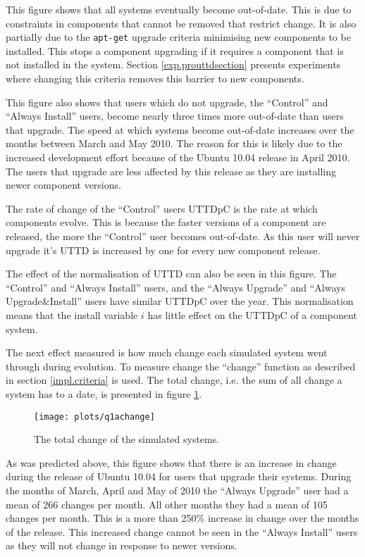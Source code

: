This figure shows that all systems eventually become out-of-date.
This is due to constraints in components that cannot be removed that restrict change. 
It is also partially due to the \texttt{apt-get} upgrade criteria minimising new components to be installed.
This stops a component upgrading if it requires a component that is not installed in the system.
Section \ref{exp.prouttdsection} presents experiments where changing this criteria removes this barrier to new components. 

This figure also shows that users which do not upgrade, the ``Control'' and ``Always Install'' users, become nearly three times more out-of-date than users that upgrade.
The speed at which systems become out-of-date increases over the months between March and May 2010.
The reason for this is likely due to the increased development effort because of the Ubuntu 10.04 release in April 2010.
The users that upgrade are less affected by this release as they are installing newer component versions.

The rate of change of the ``Control'' users UTTDpC is the rate at which components evolve.
This is because the faster versions of a component are released, the more the ``Control'' user becomes out-of-date.
As this user will never upgrade it's UTTD is increased by one for every new component release.

The effect of the normalisation of UTTD can also be seen in this figure.
The ``Control'' and ``Always Install'' users, and the ``Always Upgrade'' and ``Always Upgrade\&Install'' users have similar UTTDpC over the year.
This normalisation means that the install variable $i$ has little effect on the UTTDpC of a component system.


The next effect measured is how much change each simulated system went through during evolution.
To measure change the ``change'' function as described in section \ref{impl.criteria} is used.
The total change, i.e. the sum of all change a system has to a date, is presented in figure \ref{exp.q1achange}.
\begin{figure}[htp]
\begin{center}
  \texttt{[image: plots/q1achange]}
  \caption{The total change of the simulated systems.}
  \label{exp.q1achange}
\end{center}
\end{figure}

As was predicted above, this figure shows that there is an increase in change during the release of Ubuntu 10.04 for users that upgrade their systems.
During the months of March, April and May of 2010 the ``Always Upgrade'' user had a mean of 266 changes per month.
All other months they had a mean of 105 changes per month.
This is a more than 250\% increase in change over the months of the release.
This increased change cannot be seen in the ``Always Install'' users as they will not change in response to newer versions.

